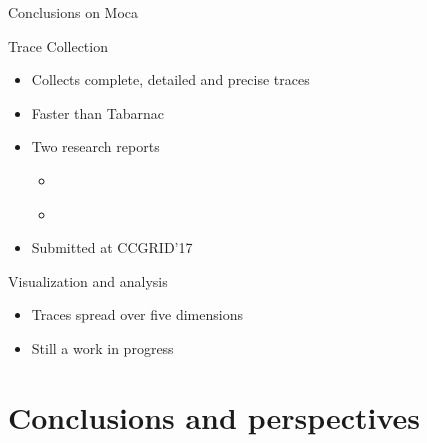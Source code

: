 \documentclass[xcolor={usenames,dvipsnames},hyperref={pdfusetitle}]{beamer}
\begin{document}
\begin{frame}{Conclusions on Moca}
    \begin{exampleblock}{Trace Collection}
        \begin{itemize}
            \item Collects complete, detailed and precise traces
            \item Faster than Tabarnac
            \item Two research reports
                \begin{itemize}
                    \item \cite{Beniamine15Memory}
                    \item \cite{Beniamine16Moca}
                \end{itemize}
            \item Submitted at CCGRID'17
        \end{itemize}
    \end{exampleblock}
    \pause
    \begin{block}{Visualization and analysis}
        \begin{itemize}
            \item Traces spread over five dimensions
            \item Still a work in progress
        \end{itemize}
    \end{block}
\end{frame}

\section{Conclusions and perspectives}
\end{document}
